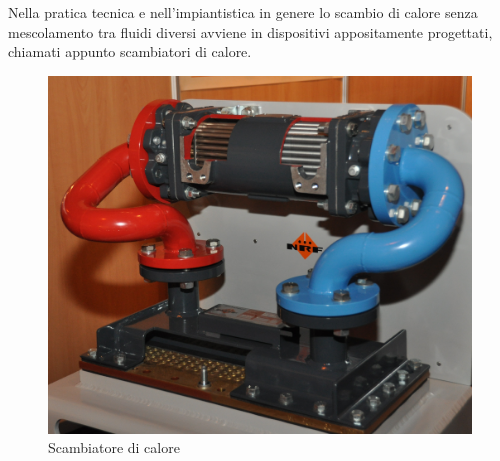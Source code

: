 \documentclass[a4paper]{report}
\begin{document}
    
Nella pratica tecnica e nell'impiantistica in genere lo scambio di calore senza mescolamento tra fluidi diversi avviene in dispositivi appositamente progettati, chiamati appunto scambiatori di calore.

      \begin{figure}
        \centering
        \includegraphics[scale=0.2]{heat}
        \caption{Scambiatore di calore}
    \end{figure}
\end{document}

